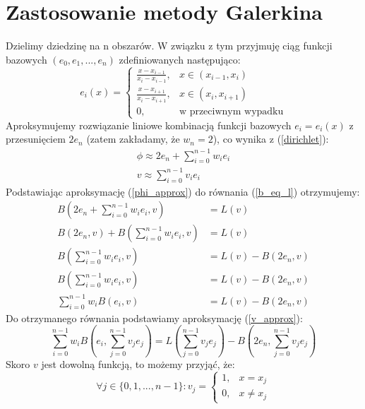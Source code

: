 \documentclass[a4paper,12pt]{article}
\begin{document}
    \section{Zastosowanie metody Galerkina}
    Dzielimy dziedzinę na n obszarów.
    W związku z tym przyjmuję ciąg funkcji bazowych \((e_0, e_1, ..., e_n)\) zdefiniowanych następująco:
    \begin{equation}
        e_i(x) =
        \begin{cases}
            \frac{x-x_{i-1}}{x_i-x_{i-1}},& x \in (x_{i-1}, x_i) \\
            \frac{x-x_{i+1}}{x_i-x_{i+1}},& x \in (x_i, x_{i+1}) \\
            0,& \text{w przeciwnym wypadku}
        \end{cases} \label{e_def}
    \end{equation}
    Aproksymujemy rozwiązanie liniowe kombinacją funkcji bazowych \(e_i = e_i(x)\) z przesunięciem \(2e_n\) (zatem zakładamy, że \(w_n = 2\)), co wynika z (\ref{dirichlet}):
    \begin{gather}
        \phi \approx 2e_n + \sum_{i=0}^{n-1} w_i e_i \label{phi_approx}\\
        v \approx \sum_{i=0}^{n-1} v_i e_i \label{v_approx}
    \end{gather}
    Podstawiając aproksymację (\ref{phi_approx}) do równania (\ref{b_eq_l}) otrzymujemy:
    \begin{align*}
        B\left(2e_n + \sum_{i=0}^{n-1} w_i e_i, v\right) &= L(v) \\
        B(2e_n, v) + B\left(\sum_{i=0}^{n-1} w_i e_i, v\right) &= L(v) \\
        B\left(\sum_{i=0}^{n-1} w_i e_i, v\right) &= L(v)-B(2e_n, v) \\
        B\left(\sum_{i=0}^{n-1} w_i e_i, v\right) &= L(v)-B(2e_n, v) \\
        \sum_{i=0}^{n-1} w_i B(e_i, v) &= L(v)-B(2e_n, v)
    \end{align*}
    Do otrzymanego równania podstawiamy aproksymację (\ref{v_approx}):
    \begin{equation*}
        \sum_{i=0}^{n-1} w_i B\left(e_i, \sum_{j=0}^{n-1} v_j e_j\right) = L\left(\sum_{j=0}^{n-1} v_j e_j\right)-B\left(2e_n, \sum_{j=0}^{n-1} v_j e_j\right)
    \end{equation*}
    Skoro \(v\) jest dowolną funkcją, to możemy przyjąć, że:
    \begin{equation*}
        \forall j \in \{0,1,...,n-1\}: v_j = 
        \begin{cases}
            1,& x = x_j \\
            0,& x \neq x_j
        \end{cases}
    \end{equation*}
\end{document}
